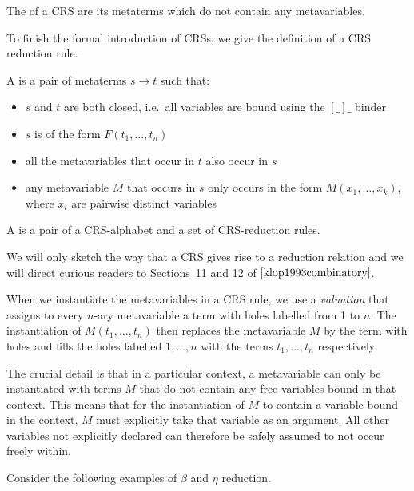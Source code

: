 \begin{definition}
  The  of a CRS are its metaterms which do not contain any
  metavariables.
\end{definition}

To finish the formal introduction of CRSs, we give the definition of a CRS
reduction rule.

\begin{definition}
  A  is a pair of metaterms $s \to t$ such that:
  \begin{itemize}
  \item $s$ and $t$ are both closed, i.e.\ all variables are bound using
    the $[\_]\_$ binder
  \item $s$ is of the form $F(t_1,\ldots,t_n)$
  \item all the metavariables that occur in $t$ also occur in $s$
  \item any metavariable $M$ that occurs in $s$ only occurs in the form
    $M(x_1,\ldots,x_k)$, where $x_i$ are pairwise distinct variables
  \end{itemize}
\end{definition}

\begin{definition}
  A  is a pair of a CRS-alphabet
  and a set of CRS-reduction rules.
\end{definition}

We will only sketch the way that a CRS gives rise to a reduction relation
and we will direct curious readers to Sections~11 and 12 of
$\cite{klop1993combinatory}$.

When we instantiate the metavariables in a CRS rule, we use a
\emph{valuation} that assigns to every $n$-ary metavariable a term with
holes labelled from 1 to $n$. The instantiation of $M(t_1,\ldots,t_n)$ then
replaces the metavariable $M$ by the term with holes and fills the holes
labelled $1,\ldots,n$ with the terms $t_1,\ldots,t_n$ respectively.

The crucial detail is that in a particular context, a metavariable can only
be instantiated with terms $M$ that do not contain any free variables bound
in that context. This means that for the instantiation of $M$ to contain a
variable bound in the context, $M$ must explicitly take that variable as an
argument. All other variables not explicitly declared can therefore be
safely assumed to not occur freely within.

Consider the following examples of $\beta$ and $\eta$ reduction.

